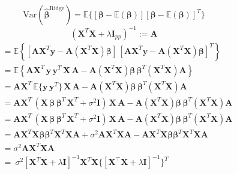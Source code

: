 \documentclass[twoside,11pt]{report}
\begin{document}
$$
\mbox{Var}(\mathbf{\hat{\beta}}^{\mathrm{Ridge}})  = \mathbb{E} \{ [\mathbf{\beta} - \mathbb{E}(\mathbf{\beta})] [\mathbf{\beta} - \mathbb{E}(\mathbf{\beta})]^{T} \}
$$
$$
\left(\mathbf{X}^T\mathbf{X}+\lambda\mathbf{I}_{pp}\right)^{-1} := \mathbf{A} 
$$
\begin{align*}
& = \mathbb{E} \left\{ \left[\mathbf{A}\mathbf{X}^T\mathbf{y} - \mathbf{A}\left(\mathbf{X}^T  \mathbf{X}\right)\mathbf{\beta}\right]
 \, 
\left[\mathbf{A}\mathbf{X}^T\mathbf{y} - \mathbf{A}\left(\mathbf{X}^T  \mathbf{X}\right)\mathbf{\beta}\right]^{T} \right\}
 \\
& = \mathbb{E} \left\{ \mathbf{A}\mathbf{X}^T \, \mathbf{y} \, \mathbf{y}^{T} \, \mathbf{X} \, \mathbf{A} - \mathbf{A}\left(\mathbf{X}^T  \mathbf{X}\right)\mathbf{\beta} \, \mathbf{\beta}^{T} \left(\mathbf{X}^T  \mathbf{X}\right) \mathbf{A} \right\}
 \\
& =  \mathbf{A}\mathbf{X}^T \, \mathbb{E} \{ \mathbf{y} \, \mathbf{y}^{T} \} \, \mathbf{X} \, \mathbf{A} - \mathbf{A}\left(\mathbf{X}^T  \mathbf{X}\right)\mathbf{\beta} \, \mathbf{\beta}^{T} \left(\mathbf{X}^T  \mathbf{X}\right) \mathbf{A}
\\
& = \mathbf{A}\mathbf{X}^T \, \left(\mathbf{X} \, \mathbf{\beta} \, \mathbf{\beta}^{T} \,  \mathbf{X}^{T} + \sigma^2 \mathbf{I}\right) \, \mathbf{X} \, \mathbf{A} - \mathbf{A}\left(\mathbf{X}^T  \mathbf{X}\right)\mathbf{\beta} \, \mathbf{\beta}^{T} \left(\mathbf{X}^T  \mathbf{X}\right) \mathbf{A}
\\
& = \boldsymbol{A}\boldsymbol{X}^T \, \left(\mathbf{X} \, \boldsymbol{\beta} \, \boldsymbol{\beta}^{T} \,  \mathbf{X}^{T} + \sigma^2 \mathbf{I}\right) \, \mathbf{X} \, \boldsymbol{A} - \boldsymbol{A}\left(\mathbf{X}^T  \mathbf{X}\right)\boldsymbol{\beta} \, \boldsymbol{\beta}^{T} \left(\mathbf{X}^T  \mathbf{X}\right) \boldsymbol{A}
\\
& = \boldsymbol{A}\boldsymbol{X}^T\boldsymbol{X}\boldsymbol{\beta}\boldsymbol{\beta}^T\boldsymbol{X}^T\boldsymbol{X}\boldsymbol{A} + \sigma^2\boldsymbol{A}\boldsymbol{X}^T\boldsymbol{X}\boldsymbol{A} - \boldsymbol{A}\boldsymbol{X}^T\boldsymbol{X}\boldsymbol{\beta}\boldsymbol{\beta}^T\boldsymbol{X}^T\boldsymbol{X}\boldsymbol{A}
\\
& = \sigma^2\boldsymbol{A}\boldsymbol{X}^T\boldsymbol{X}\boldsymbol{A} 
\\
& = \: \sigma^2[  \mathbf{X}^{T} \mathbf{X} + \lambda \mathbf{I} ]^{-1}  \mathbf{X}^{T}\mathbf{X} \{ [  \mathbf{X}^{\top} \mathbf{X} + \lambda \mathbf{I} ]^{-1}\}^{T}
\end{align*}





\vskip 0.2in

% 

%
\end{document}
